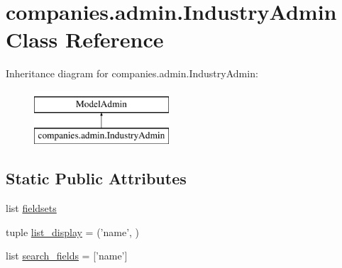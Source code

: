\hypertarget{classcompanies_1_1admin_1_1_industry_admin}{\section{companies.\-admin.\-Industry\-Admin Class Reference}
\label{classcompanies_1_1admin_1_1_industry_admin}
}
Inheritance diagram for companies.\-admin.\-Industry\-Admin\-:\begin{figure}[H]
\begin{center}
\leavevmode
\includegraphics[height=2.000000cm]{classcompanies_1_1admin_1_1_industry_admin}
\end{center}
\end{figure}
\subsection*{Static Public Attributes}
\begin{DoxyCompactItemize}
\item 
list \hyperlink{classcompanies_1_1admin_1_1_industry_admin_add9f1424f3f77e0dd9fa544da998aca0}{fieldsets}
\item 
tuple \hyperlink{classcompanies_1_1admin_1_1_industry_admin_a0998ac15391f9f3f652ada6dcfe602df}{list\-\_\-display} = ('name', )
\item 
list \hyperlink{classcompanies_1_1admin_1_1_industry_admin_a2d8c3d6ebdcbe0b61859e786129f7553}{search\-\_\-fields} = \mbox{[}'name'\mbox{]}
\end{DoxyCompactItemize}


